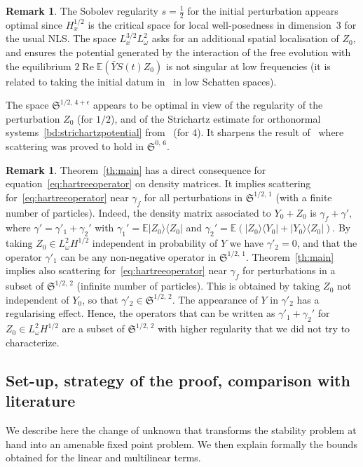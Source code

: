 \documentclass[10pt]{amsart}
\theoremstyle{definition}\newtheorem{defi}[theo]{Definition}\newtheorem{rema}[theo]{Remark}\newtheorem{exam}[theo]{Example}\newtheorem{exem}[theo]{Example}\newtheorem{nota}[theo]{Notation}
\newcommand{\E}{\mathbb{E}}
\DeclareMathOperator{\re}{Re}
\newcommand{\frkS}{\mathfrak{S}}
\begin{document}
\begin{rema}
The Sobolev regularity $s=\frac12$ for the initial perturbation appears optimal since $H^{1/2}_x$ is the critical space for local well-posedness in dimension~$3$ for the usual NLS. The space $L^{3/2}_xL^2_\omega$ asks for an additional spatial localisation of $Z_0$, and ensures the potential generated by the interaction of the free evolution with the equilibrium $2\re \E(\bar Y S(t)Z_0)$ is not singular at low frequencies (it is related to taking the initial datum in~\cite{CHP2,lewsab2} in low Schatten spaces).

The space $\frkS^{1/2,\,4+\epsilon}$ appears to be optimal in view of the regularity of the perturbation $Z_0$ (for $1/2$), and of the Strichartz estimate for orthonormal systems~\eqref{bd:strichartzpotential} from~\cite{FLLS,FS} (for $4$). It sharpens the result of~\cite{CHP2} where scattering was proved to hold in $\frkS^{0,\,6}$.
\end{rema}


\begin{rema}
Theorem~\ref{th:main} has a direct consequence for equation~\eqref{eq:hartreeoperator} on density matrices. It implies scattering for~\eqref{eq:hartreeoperator} near $\gamma_f$ for all perturbations in $\frkS^{1/2,\,1}$ (with a finite number of particles). Indeed, the density matrix associated to $Y_0+Z_0$ is $\gamma_f+\gamma'$, where $\gamma'=\gamma'_1+\gamma_2'$ with $\gamma_1'=\E |Z_0\rangle \langle Z_0|$ and $\gamma_2'=\E (|Z_0\rangle \langle Y_0|+|Y_0\rangle \langle Z_0|)$. By taking $Z_0\in L^2_\omega H^{1/2}$ independent in probability of $Y$ we have $\gamma'_2=0$, and that the operator $\gamma'_1$ can be any non-negative operator in $\frkS^{1/2,\,1}$. Theorem~\ref{th:main} implies also scattering for~\eqref{eq:hartreeoperator} near $\gamma_f$ for perturbations in a subset of $\frkS^{1/2,\,2}$ (infinite number of particles). This is obtained by taking $Z_0$ not independent of $Y_0$, so that $\gamma'_2\in \frkS^{1/2,\,2}$. The appearance of $Y$ in $\gamma'_2$ has a regularising effect. Hence, the operators that can be written as $\gamma'_1+\gamma_2'$ for $Z_0\in L^2_\omega H^{1/2}$ are a subset of $\frkS^{1/2,\,2}$ with higher regularity that we did not try to characterize.
\end{rema}



\subsection{Set-up, strategy of the proof, comparison with literature} \label{setup}
We describe here the change of unknown that transforms the stability problem at hand into an amenable fixed point problem. We then explain formally the bounds obtained for the linear and multilinear terms.
\end{document}
